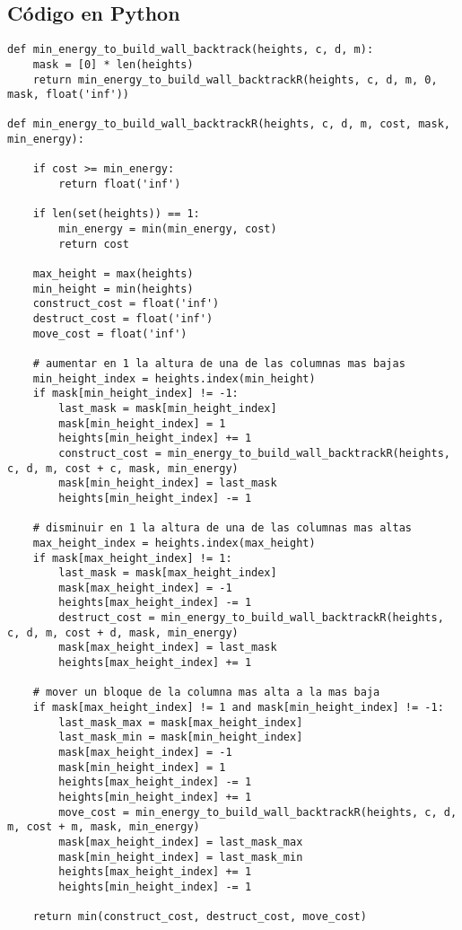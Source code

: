 \documentclass[a4paper,12pt]{article}
\begin{document}
\subsection{Código en Python}
\begin{lstlisting}
def min_energy_to_build_wall_backtrack(heights, c, d, m):
	mask = [0] * len(heights)
	return min_energy_to_build_wall_backtrackR(heights, c, d, m, 0, mask, float('inf'))

def min_energy_to_build_wall_backtrackR(heights, c, d, m, cost, mask, min_energy):

	if cost >= min_energy:
		return float('inf') 

	if len(set(heights)) == 1:
		min_energy = min(min_energy, cost)
		return cost

	max_height = max(heights)
	min_height = min(heights)
	construct_cost = float('inf')
	destruct_cost = float('inf')
	move_cost = float('inf')

	# aumentar en 1 la altura de una de las columnas mas bajas 
	min_height_index = heights.index(min_height)
	if mask[min_height_index] != -1:
		last_mask = mask[min_height_index]
		mask[min_height_index] = 1
		heights[min_height_index] += 1
		construct_cost = min_energy_to_build_wall_backtrackR(heights, c, d, m, cost + c, mask, min_energy)
		mask[min_height_index] = last_mask
		heights[min_height_index] -= 1

	# disminuir en 1 la altura de una de las columnas mas altas
	max_height_index = heights.index(max_height)
	if mask[max_height_index] != 1:
		last_mask = mask[max_height_index]
		mask[max_height_index] = -1
		heights[max_height_index] -= 1
		destruct_cost = min_energy_to_build_wall_backtrackR(heights, c, d, m, cost + d, mask, min_energy)
		mask[max_height_index] = last_mask
		heights[max_height_index] += 1

	# mover un bloque de la columna mas alta a la mas baja
	if mask[max_height_index] != 1 and mask[min_height_index] != -1:
		last_mask_max = mask[max_height_index]
		last_mask_min = mask[min_height_index]
		mask[max_height_index] = -1
		mask[min_height_index] = 1
		heights[max_height_index] -= 1
		heights[min_height_index] += 1
		move_cost = min_energy_to_build_wall_backtrackR(heights, c, d, m, cost + m, mask, min_energy)
		mask[max_height_index] = last_mask_max
		mask[min_height_index] = last_mask_min
		heights[max_height_index] += 1
		heights[min_height_index] -= 1

	return min(construct_cost, destruct_cost, move_cost)

\end{lstlisting}
\end{document}
